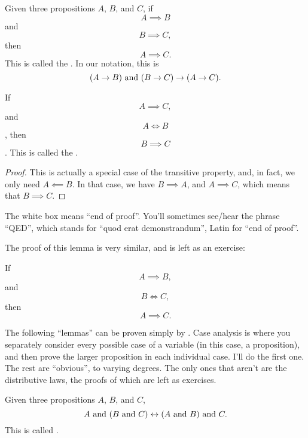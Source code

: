 \begin{axiom}
  Given three propositions $A$, $B$, and $C$, if $$A \implies B$$
  and $$B \implies C,$$ then $$A \implies C.$$ This is called the
  . In our notation, this is
  $$(A \to B)\text{ and } (B \to C) \to (A \to C).$$
\end{axiom}

\begin{lemma}
  If $$A \implies C,$$ and $$A \iff B$$, then $$B \implies C$$. This
  is called the .
\end{lemma}
\begin{proof}
  This is actually a special case of the transitive property, and, in
  fact, we only need $A \impliedby B$. In that case, we have
  $B \implies A$, and $A \implies C$, which means that $B \implies C$.
\end{proof}

The white box means ``end of proof''. You'll sometimes see/hear the
phrase ``QED'', which stands for ``quod erat demonstrandum'', Latin
for ``end of proof''.

The proof of this lemma is very similar, and is left as an exercise:

\begin{lemma}
  \label{conclusion-substitution}
  If $$A \implies B,$$ and $$B \iff C,$$ then $$A \implies C.$$
\end{lemma}

The following ``lemmas'' can be proven simply by . Case analysis is where you separately consider every
possible case of a variable (in this case, a proposition), and then
prove the larger proposition in each individual case. I'll do the
first one. The rest are ``obvious'', to varying degrees. The only ones
that aren't are the distributive laws, the proofs of which are left as
exercises.

\begin{lemma}
  Given three propositions $A$, $B$, and $C$,
  $$A \text{ and } (B \text{ and } C) \leftrightarrow (A \text{ and } B) \text{ and } C.$$ This is called
  .
\end{lemma}

